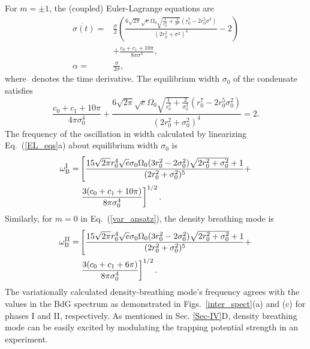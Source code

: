\documentclass[pra,twocolumn,aps,superscriptaddress,showpacs,longbibliography]{revtex4-1}
\begin{document}
For $ m = \pm1$, the (coupled) Euler-Lagrange equations are
\begin{subequations}\label{EL_eqs}
\begin{align}
\ddot{\sigma(t)} =&\frac{\sigma}{2}\left(\frac{6 \sqrt{2 \pi } \sqrt{e} \Omega_0  \sqrt{\frac{1}{r_0^2}+\frac{2}{\sigma^2}} \left(r_0^7-2 r_0^5 \sigma^2\right)}{\left(2r_0^2+\sigma^2\right)^4}-2\right) \nonumber\\& +\frac{c_0+c_1+10 \pi }{8 \pi  \sigma^3},\\
\alpha=&\frac{\dot{\sigma}}{2\sigma},
\end{align}
\end{subequations}
where $\Dot{}$ denotes the time derivative.
The equilibrium width $\sigma_{0}$ of the condensate satisfies
\begin{equation}
 \frac{c_0+c_1+10 \pi }{4 \pi  \sigma^4_{0}}+\frac{6 \sqrt{2 \pi } \sqrt{e} \Omega_0  \sqrt{\frac{1}{r_0^2}
 +\frac{2}{\sigma^2_{0}}} \left(r_0^7-2 r_0^5 \sigma^2_{0}\right)}{\left(2r_0^2+\sigma^2_{0}\right)^4}=2.\nonumber
\end{equation}
The frequency of the oscillation in width calculated by linearizing Eq.~(\ref{EL_eqs}a) about equilibrium width $\sigma_{0}$ is
\begin{align}
\omega_{\rm B}^{\rm I}=& \left[ \frac{15\sqrt{2\pi }r_0^4\sqrt{e}\sigma_{0} \Omega_0 (3 r_0^2-2\sigma^2_{0}) \sqrt{{2r_0^2}+{\sigma^2_{0}}}+1}{(2 r_0^2+\sigma^2_{0} )^5} +\right. \nonumber\\ & \left.\frac{3(c_0+c_1+10\pi)}{8\pi\sigma^4_{0}}\right]^{1/2}.
\end{align}
Similarly, for $m = 0$ in Eq.~(\ref{var_ansatz}), the density breathing mode is 
\begin{align}
\omega_{\rm B}^{\rm II}=&\left[\frac{15\sqrt{2\pi }r_0^4\sqrt{e}\sigma_{0} \Omega_0 (3 r_0^2-2\sigma^2_{0}) \sqrt{2{r_0^2}+{\sigma^2_{0}}}+1}{(2 r_0^2+\sigma^2_{0})^5}
+\right. \nonumber \\& \left.\frac{3(c_0+c_1+6\pi)}{8\pi\sigma^4_{0}}\right]^{1/2}.
\end{align}
The variationally calculated density-breathing mode's frequency agrees with the values in the BdG spectrum as
demonstrated in Figs.~\ref{inter_spect}(a) and (c) for phases I and II, respectively. As mentioned in
Sec. \ref{Sec-IV}D, density breathing mode can be easily excited by modulating the trapping potential strength
in an experiment.
\end{document}
